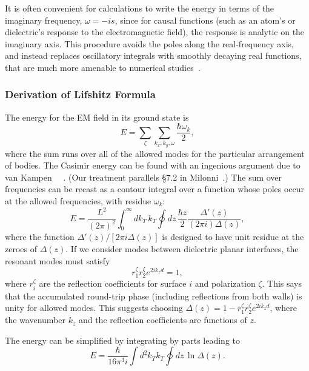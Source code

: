 It is often convenient for calculations to write the energy in terms of the imaginary frequency, $\omega = -is$,
since for causal functions (such as an atom's or dielectric's response to the electromagnetic field), 
the response is analytic on the imaginary axis.    
This procedure avoids the poles along the real-frequency axis, and instead replaces oscillatory
integrals with smoothly decaying real functions, that are much more amenable to numerical studies~\cite{Johnson2011}.

\subsubsection{Derivation of Lifshitz Formula}

The energy for the EM field in its ground state is 
\begin{equation}
  E = \sum_{\zeta}\sum_{k_x,k_y,\omega} \frac{\hbar\omega_k}{2},
\end{equation}
where the sum runs over all of the allowed modes for the particular arrangement of bodies.  
The Casimir energy can be found with an ingenious argument due to van Kampen~\etal
~\cite{vanKampen1968}.  (Our treatment parallels \S 7.2 in Milonni~\cite{Milonni1994}.)
The sum over frequencies can be recast as a contour integral over a function whose poles occur at the allowed
frequencies, with residue $\omega_k$:  
\begin{equation}
  E = \frac{L^2}{(2\pi)^2}\int_0^\infty dk_T\,k_T\oint dz\, \frac{\hbar z}{2} \frac{\Delta'(z)}{(2\pi i)\Delta(z)},
\end{equation}
where the function $\Delta'(z)/[2\pi i\Delta(z)]$ is designed to have unit residue at the zeroes of $\Delta(z)$. 
If we consider modes between dielectric planar interfaces, the resonant modes must satisfy
\begin{equation}
  r^{\zeta}_1r^{\zeta}_2 e^{2ik_z d}=1,
\end{equation}
where $r^\zeta_i$ are the reflection coefficients for surface $i$ and polarization $\zeta$.
This says that the accumulated round-trip phase (including reflections from both walls) is unity for
allowed modes.  
This suggests choosing $\Delta(z) = 1-r^{\zeta}_1r^{\zeta}_2 e^{2ik_z d}$, where the wavenumber $k_z$
and the reflection coefficients are functions of $z$.  

The energy can be simplified by integrating by parts leading to 
\begin{equation}
  E = \frac{\hbar}{16\pi^3 i}\int d^2k_Tk_T\oint dz \, \ln\Delta(z).
\end{equation}

